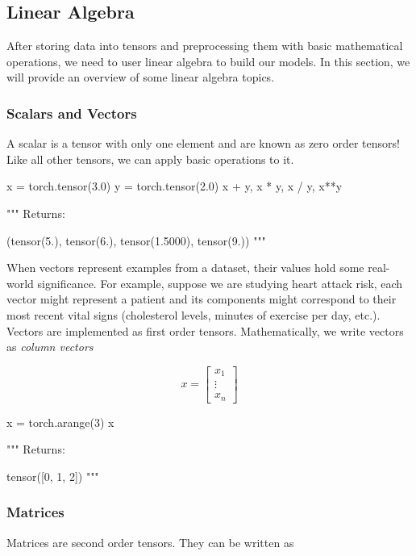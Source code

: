 \documentclass[12pt]{article}
\begin{document}
\subsection{Linear Algebra}
After storing data into tensors and preprocessing them with basic mathematical operations, we need to user linear algebra to build our models.  In this section, we will provide an overview of some linear algebra topics.

\subsubsection{Scalars and Vectors}
A scalar is a tensor with only one element and are known as zero order tensors!  Like all other tensors, we can apply basic operations to it.

\vspace{6pt}
\begin{python}
x = torch.tensor(3.0)
y = torch.tensor(2.0)
x + y, x * y, x / y, x**y

"""
Returns:

  (tensor(5.), tensor(6.), tensor(1.5000), tensor(9.))
"""
\end{python}
\vspace{6pt}

\newpage
When vectors represent examples from a dataset, their values hold some real-world significance.  For example, suppose we are studying heart attack risk, each vector might represent a patient and its components might correspond to their most recent vital signs (cholesterol levels, minutes of exercise per day, etc.).  Vectors are implemented as first order tensors.  Mathematically, we write vectors as \textit{column vectors}

$$
x = \begin{bmatrix}
  x_{1} \\
  \vdots \\
  x_{n}
\end{bmatrix}
$$

\vspace{6pt}
\begin{python}
x = torch.arange(3)
x

"""
Returns:

  tensor([0, 1, 2])
"""
\end{python}
\vspace{6pt}



\subsubsection{Matrices}
Matrices are second order tensors.  They can be written as 
\end{document}

